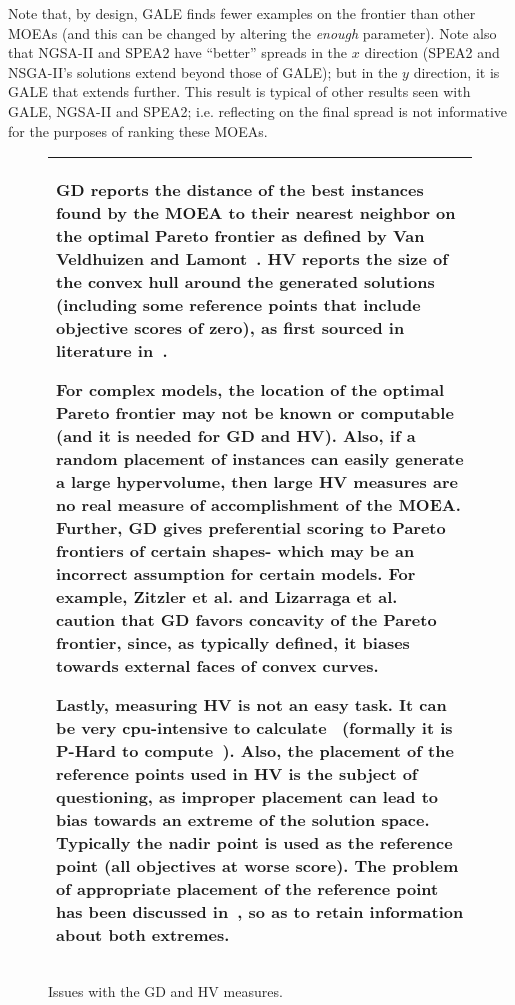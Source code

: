 \documentclass[10pt,journal,compsoc]{IEEEtran}
\begin{document}
Note that, by design, GALE finds fewer
examples on the frontier than other MOEAs (and
this can be changed by altering the {\em enough}
parameter).  Note also that NGSA-II and
SPEA2 have ``better'' spreads in the $x$ direction (SPEA2 and 
NSGA-II's solutions extend beyond those of GALE); but
in the $y$ direction, it is GALE that extends further.
This result is typical of other
results seen with GALE, NGSA-II and SPEA2; i.e.
reflecting on the final spread is not informative
for the purposes of ranking these MOEAs.



\begin{figure}[!t]

\begin{tabular}{|p{.95\linewidth}|}\hline
\small
GD
 reports the distance of the best instances
found by the MOEA to their nearest neighbor on the optimal Pareto frontier as
defined by Van Veldhuizen and Lamont~\cite{Veldhuizen98evolutionarycomputation}.
HV reports the size of the convex hull around the generated
solutions (including some reference points that include objective scores of zero), as
first sourced in literature in~\cite{Zitzler98multiobjectiveoptimization}.

For complex models, the location of the optimal Pareto frontier may not be known or computable
(and it is needed for GD and HV).
Also, 
if a  random placement of instances
can easily generate a large hypervolume, then large 
HV measures are no real measure of accomplishment
of the MOEA.
Further, GD gives preferential scoring to
Pareto frontiers of certain shapes- which may be an incorrect
assumption for certain models.
For example, Zitzler et al. \cite{Zitzler98multiobjectiveoptimization}
and Lizarraga et al.~\cite{Lizarraga-Lizarraga:2008:GMQ:1389095.1389227}
caution that 
GD
favors concavity of the Pareto frontier,
since, as typically defined,
it  biases towards external faces of convex
curves.

Lastly, measuring HV is not an easy task. It can be very cpu-intensive to calculate~\cite{bader11}
(formally it is P-Hard to
compute~\cite{Bringmann2010601}).  Also, the placement of the reference points used in HV is the
subject of questioning, as improper placement can lead to bias towards an extreme of the solution space.  
Typically the nadir point is used as the reference point (all objectives at worse score). 
The problem of appropriate placement of the reference point has been discussed
in~\cite{Auger:2009:THI:1527125.1527138}, so as to retain information about both extremes.   \\\hline
\end{tabular}
\caption{Issues with the GD and HV measures.}\label{fig:issues}
\end{figure}
\end{document}
